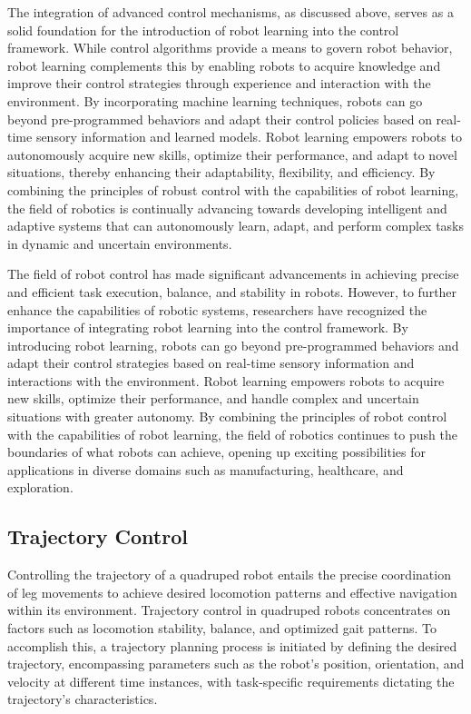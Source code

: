 The integration of advanced control mechanisms, as discussed above, serves as a solid foundation for the introduction of robot learning into the control framework. While control algorithms provide a means to govern robot behavior, robot learning complements this by enabling robots to acquire knowledge and improve their control strategies through experience and interaction with the environment. By incorporating machine learning techniques, robots can go beyond pre-programmed behaviors and adapt their control policies based on real-time sensory information and learned models. Robot learning empowers robots to autonomously acquire new skills, optimize their performance, and adapt to novel situations, thereby enhancing their adaptability, flexibility, and efficiency. By combining the principles of robust control with the capabilities of robot learning, the field of robotics is continually advancing towards developing intelligent and adaptive systems that can autonomously learn, adapt, and perform complex tasks in dynamic and uncertain environments.

The field of robot control has made significant advancements in achieving precise and efficient task execution, balance, and stability in robots. However, to further enhance the capabilities of robotic systems, researchers have recognized the importance of integrating robot learning into the control framework. By introducing robot learning, robots can go beyond pre-programmed behaviors and adapt their control strategies based on real-time sensory information and interactions with the environment. Robot learning empowers robots to acquire new skills, optimize their performance, and handle complex and uncertain situations with greater autonomy. By combining the principles of robot control with the capabilities of robot learning, the field of robotics continues to push the boundaries of what robots can achieve, opening up exciting possibilities for applications in diverse domains such as manufacturing, healthcare, and exploration.

\subsection{Trajectory Control}
Controlling the trajectory of a quadruped robot entails the precise coordination of leg movements to achieve desired locomotion patterns and effective navigation within its environment. Trajectory control in quadruped robots concentrates on factors such as locomotion stability, balance, and optimized gait patterns. To accomplish this, a trajectory planning process is initiated by defining the desired trajectory, encompassing parameters such as the robot's position, orientation, and velocity at different time instances, with task-specific requirements dictating the trajectory's characteristics.

